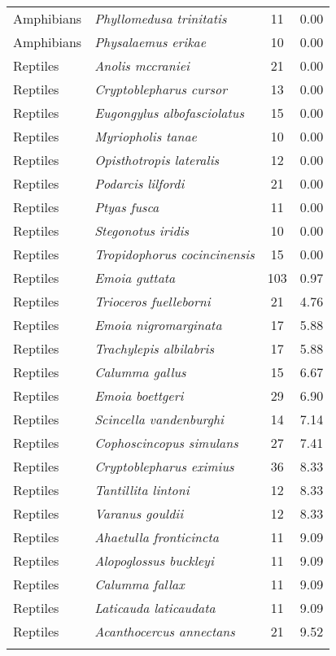 \begin{longtable}{l>{\itshape}lcc}
  Amphibians & Phyllomedusa trinitatis &  11 & 0.00 \\ 
  Amphibians & Physalaemus erikae &  10 & 0.00 \\ 
  Reptiles & Anolis mccraniei &  21 & 0.00 \\ 
  Reptiles & Cryptoblepharus cursor &  13 & 0.00 \\ 
  Reptiles & Eugongylus albofasciolatus &  15 & 0.00 \\ 
  Reptiles & Myriopholis tanae &  10 & 0.00 \\ 
  Reptiles & Opisthotropis lateralis &  12 & 0.00 \\ 
  Reptiles & Podarcis lilfordi &  21 & 0.00 \\ 
  Reptiles & Ptyas fusca &  11 & 0.00 \\ 
  Reptiles & Stegonotus iridis &  10 & 0.00 \\ 
  Reptiles & Tropidophorus cocincinensis &  15 & 0.00 \\ 
  Reptiles & Emoia guttata & 103 & 0.97 \\ 
  Reptiles & Trioceros fuelleborni &  21 & 4.76 \\ 
  Reptiles & Emoia nigromarginata &  17 & 5.88 \\ 
  Reptiles & Trachylepis albilabris &  17 & 5.88 \\ 
  Reptiles & Calumma gallus &  15 & 6.67 \\ 
  Reptiles & Emoia boettgeri &  29 & 6.90 \\ 
  Reptiles & Scincella vandenburghi &  14 & 7.14 \\ 
  Reptiles & Cophoscincopus simulans &  27 & 7.41 \\ 
  Reptiles & Cryptoblepharus eximius &  36 & 8.33 \\ 
  Reptiles & Tantillita lintoni &  12 & 8.33 \\ 
  Reptiles & Varanus gouldii &  12 & 8.33 \\ 
  Reptiles & Ahaetulla fronticincta &  11 & 9.09 \\ 
  Reptiles & Alopoglossus buckleyi &  11 & 9.09 \\ 
  Reptiles & Calumma fallax &  11 & 9.09 \\ 
  Reptiles & Laticauda laticaudata &  11 & 9.09 \\ 
  Reptiles & Acanthocercus annectans &  21 & 9.52 \\ 
   \hline
\hline
\label{table_worst}
\end{longtable}
